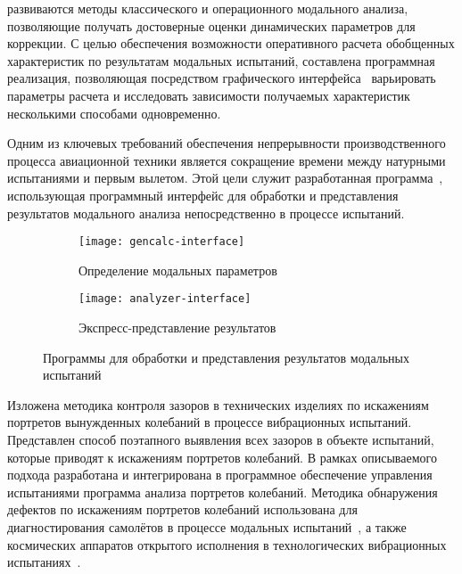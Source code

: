 
 развиваются методы классического и операционного модального анализа, позволяющие получать достоверные оценки динамических параметров для коррекции. С целью обеспечения возможности оперативного расчета обобщенных характеристик по результатам модальных испытаний, составлена программная реализация, позволяющая посредством графического интерфейса~ варьировать параметры расчета и исследовать зависимости получаемых характеристик несколькими способами одновременно. 

Одним из ключевых требований обеспечения непрерывности производственного процесса авиационной техники является сокращение времени между натурными испытаниями и первым вылетом. Этой цели служит разработанная программа~, использующая программный интерфейс  для обработки и представления результатов модального анализа непосредственно в процессе испытаний.

\begin{figure}[!htb]
	\centering
	\begin{subfigure}[t]{0.45\textwidth}
		\centering
		\texttt{[image: gencalc-interface]}
		\caption{\small Определение модальных параметров} \label{subfig:gencalc-interface}
	\end{subfigure}
	\hfill
	\begin{subfigure}[t]{0.52\textwidth}
		\centering
		\texttt{[image: analyzer-interface]}
		\caption{\small Экспресс-представление результатов} \label{subfig:analyzer-interface}
	\end{subfigure}
	\vspace{1em}
	\caption{Программы для обработки и представления результатов модальных испытаний} 
\end{figure}

Изложена методика контроля зазоров в технических изделиях по искажениям портретов вынужденных колебаний в процессе вибрационных испытаний. Представлен способ поэтапного выявления всех зазоров в объекте испытаний, которые приводят к искажениям портретов колебаний. В рамках описываемого подхода разработана и интегрирована в программное обеспечение управления испытаниями программа анализа портретов колебаний. Методика обнаружения дефектов по искажениям портретов колебаний использована для диагностирования самолётов в процессе модальных испытаний~, а также космических аппаратов открытого исполнения в технологических вибрационных испытаниях~. 

